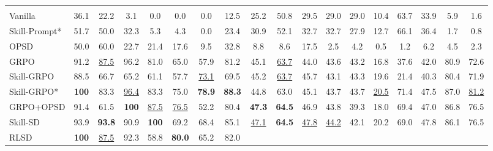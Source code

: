 \begin{table}[t]
{\begin{tabular}{l CCCCCCC CCCCCCCC CC }
    \midrule

      \\

    Vanilla
        & 36.1 & 22.2 & 3.1 & 0.0 & 0.0 & 0.0 & 12.5
        & 25.2 & 50.8 & 29.5 & 29.0 & 29.0 & 10.4 & 63.7 & 33.9
        & 5.9 & 1.6
        \\
    Skill-Prompt*
        & 51.7 & 50.0 & 32.3 & 5.3 & 4.3 & 0.0 & 23.4
        & 30.9 & 52.1 & 32.7 & 32.7 & 27.9 & 12.7 & 66.1 & 36.4
        & 1.7 & 0.8
        \\
    OPSD
        & 50.0 & 60.0 & 22.7 & 21.4 & 17.6 & 9.5 & 32.8
        & 8.8 & 8.6 & 17.5 & 2.5 & 4.2 & 0.5 & 1.2 & 6.2
        & 4.5 & 2.3
        \\

    GRPO
        & 91.2 & \underline{87.5} & 96.2 & 81.0 & 65.0 & 57.9 & 81.2
        & 45.1 & \underline{63.7} & 44.0 & 43.6 & 43.2 & 16.8 & 37.6 & 42.0
        & 80.9 & 72.6
        \\
    Skill-GRPO
        & 88.5 & 66.7 & 65.2 & 61.1 & 57.7 & \underline{73.1} & 69.5
        & 45.2 & \underline{63.7} & 45.7 & 43.1 & 43.3 & 19.6 & 21.4 & 40.3
        & 80.4 & 71.9
        \\
    Skill-GRPO*
        & \textbf{100} & 83.3 & \underline{96.4} & 83.3 & 75.0 & \textbf{78.9} & \textbf{88.3}
        & 44.8 & 63.0 & 45.1 & 43.7 & 43.7 & \underline{20.5} & 71.4 & 47.5
        & 87.0 & \underline{81.2}
        \\
    GRPO+OPSD
        & 91.4 & 61.5 & \textbf{100} & \underline{87.5} & \underline{76.5} & 52.2 & 80.4
        & \textbf{47.3} & \textbf{64.5} & 46.9 & 43.8 & 39.3 & 18.0 & 69.4 & 47.0
        & 86.8 & 76.5
        \\
    Skill-SD
        & 93.9 & \textbf{93.8} & 90.9 & \textbf{100} & 69.2 & 68.4 & 85.1
        & \underline{47.1} & \textbf{64.5} & \underline{47.8} & \underline{44.2} & 42.1 & 20.2 & 69.0 & 47.8
        & 86.1 & 76.5
        \\
    RLSD
        & \textbf{100} & \underline{87.5} & 92.3 & 58.8 & \textbf{80.0} & 65.2 & 82.0

\end{tabular}}
\end{table}
